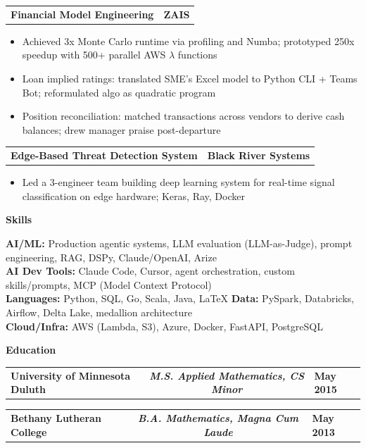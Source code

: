 \documentclass[letterpaper,10pt]{article}
\newcommand{\myitem}{\item[$\triangleright$]}
\newcommand{\resHeading}[1]{{
		\begin{tcolorbox}[size=title, sharp corners, colback=mygrey, colframe=mygrey]
			\centering\textbf{\large #1}
		\end{tcolorbox}
	}}
\newcommand{\twoColSubHeading}[2]{
		\begin{tabularx}{\columnwidth}{Xr}
				\textbf{#1} & \textbf{#2}
		\end{tabularx}
	}
\newcommand{\threeColSubHeading}[3]{
		\begin{tabularx}{\textwidth}{XcX}
				\textbf{#1} & \textit{\textbf{#2}}  & \hfill\textbf{#3}
		\end{tabularx}
	}
\begin{document}
		\twoColSubHeading{Financial Model Engineering}{ZAIS}
		\begin{itemize}
			\myitem Achieved 3x Monte Carlo runtime via profiling and Numba; prototyped 250x speedup with 500+ parallel AWS $\lambda$ functions
			\myitem Loan implied ratings: translated SME's Excel model to Python CLI + Teams Bot; reformulated algo as quadratic program
			\myitem Position reconciliation: matched transactions across vendors to derive cash balances; drew manager praise post-departure
		\end{itemize}
		\twoColSubHeading{Edge-Based Threat Detection System}{Black River Systems}
		\begin{itemize}
			\myitem Led a 3-engineer team building deep learning system for real-time signal classification on edge hardware; Keras, Ray, Docker
		\end{itemize}

	\resHeading{Skills}
		\textbf{AI/ML:} Production agentic systems, LLM evaluation (LLM-as-Judge), prompt engineering, RAG, DSPy, Claude/OpenAI, Arize \\
		\textbf{AI Dev Tools:} Claude Code, Cursor, agent orchestration, custom skills/prompts, MCP (Model Context Protocol) \\
		\textbf{Languages:} Python, SQL, Go, Scala, Java, \LaTeX{} \quad \textbf{Data:} PySpark, Databricks, Airflow, Delta Lake, medallion architecture \\
		\textbf{Cloud/Infra:} AWS (Lambda, S3), Azure, Docker, FastAPI, PostgreSQL

	\resHeading{Education}
		\threeColSubHeading{University of Minnesota Duluth}{M.S. Applied Mathematics, CS Minor}{May 2015}
		\threeColSubHeading{Bethany Lutheran College}{B.A. Mathematics, Magna Cum Laude}{May 2013}
\end{document}
